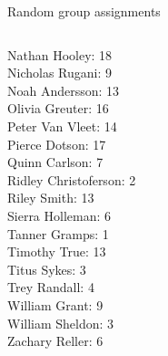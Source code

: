 \documentclass[10pt]{beamer}
\begin{document}
\begin{frame}{Random group assignments}
\begin{columns}
\begin{column}{0.33\textwidth}
Nathan Hooley: 18 \\ 
Nicholas Rugani: 9 \\ 
Noah Andersson: 13 \\ 
Olivia Greuter: 16 \\ 
Peter Van Vleet: 14 \\ 
Pierce Dotson: 17 \\ 
Quinn Carlson: 7 \\ 
Ridley Christoferson: 2 \\ 
Riley Smith: 13 \\ 
Sierra Holleman: 6 \\ 
Tanner Gramps: 1 \\ 
Timothy True: 13 \\ 
Titus Sykes: 3 \\ 
Trey Randall: 4 \\ 
William Grant: 9 \\ 
William Sheldon: 3 \\ 
Zachary Reller: 6 \\\end{column}
\end{columns}
\end{frame}
\end{document}
